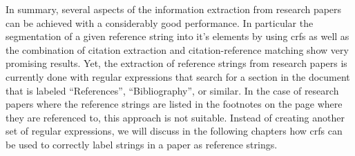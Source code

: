 In summary, several aspects of the information extraction from research papers can be achieved with a considerably good performance. In particular the segmentation of a given reference string into it's elements by using \glspl{crf} \citep{peng2004accurate,councill2008parscit,groza2012reference} as well as the combination of citation extraction and citation-reference matching \citep{powley2007evidence} show very promising results. Yet, the extraction of reference strings from research papers is currently done with regular expressions that search for a section in the document that is labeled ``References'', ``Bibliography'', or similar. In the case of research papers where the reference strings are listed in the footnotes on the page where they are referenced to, this approach is not suitable. Instead of creating another set of regular expressions, we will discuss in the following chapters how \glspl{crf} can be used to correctly label strings in a paper as reference strings.
